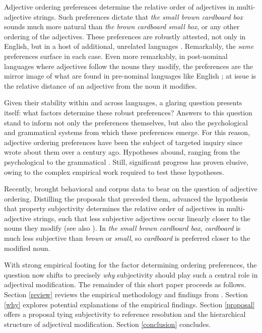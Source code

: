 \documentclass[preprint,authoryear]{elsarticle}\frenchspacing
\begin{document}
Adjective ordering preferences determine the relative order of adjectives in multi-adjective strings. Such preferences dictate that \emph{the small brown cardboard box} sounds much more natural than \emph{the brown cardboard small box}, or any other ordering of the adjectives. 
These preferences are robustly attested, not only in English, but in a host of additional, unrelated languages \citep{dixon1982,hetzron1978,lapollahuang2004,martin1969competence,sproatshih1991}. Remarkably, the \emph{same} preferences surface in each case. Even more remarkably, in post-nominal languages where adjectives follow the nouns they modify, the preferences are the mirror image of what are found in pre-nominal languages like English \citep{dixon1982,hetzron1978,sproatshih1991}; at issue is the relative distance of an adjective from the noun it modifies.

Given their stability within and across languages, a glaring question presents itself: what factors determine these robust preferences? Answers to this question stand to inform not only the preferences themselves, but also the psychological and grammatical systems from which these preferences emerge. For this reason, adjective ordering preferences have been the subject of targeted inquiry since \cite{sweet1898} wrote about them over a century ago. Hypotheses abound, ranging from the psychological \citep{sweet1898,whorf1945,ziff1960,martin1969} to the grammatical \citep{cinque1994,scott2002,laenzlinger2005,mcnallyboleda2004,svenonius2008,truswell2009}. Still, significant progress has proven elusive, owing to the complex empirical work required to test these hypotheses.

Recently, \cite{scontrasetal2017adjectives} brought behavioral and corpus data to bear on the question of adjective ordering. Distilling the proposals that preceded them, \citeauthor{scontrasetal2017adjectives} advanced the hypothesis that property subjectivity determines the relative order of adjectives in multi-adjective strings, such that less subjective adjectives occur linearly closer to the nouns they modify (see also \citealp{quirketal1985,hetzron1978,dixon1982,tucker1998,hill2012}). In \emph{the small brown cardboard box}, \emph{cardboard} is much less subjective than \emph{brown} or \emph{small}, so \emph{cardboard} is preferred closer to the modified noun.

With strong empirical footing for the factor determining ordering preferences, the question now shifts to precisely \emph{why} subjectivity should play such a central role in adjectival modification. The remainder of this short paper proceeds as follows. Section \ref{review} reviews the empirical methodology and findings from \cite{scontrasetal2017adjectives}. Section \ref{why} explores potential explanations of the empirical findings. Section \ref{proposal} offers a proposal tying subjectivity to reference resolution and the hierarchical structure of adjectival modification. Section \ref{conclusion} concludes.
\end{document}
